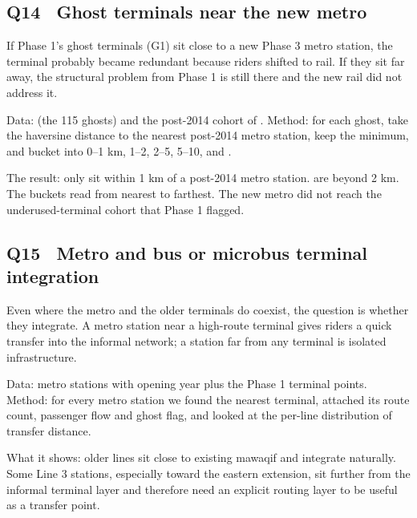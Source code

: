 \subsection{Q14 \textbullet\ Ghost terminals near the new metro}

If Phase 1's ghost terminals (G1) sit close to a new Phase 3 metro
station, the terminal probably became redundant because riders shifted
to rail. If they sit far away, the structural problem from Phase 1 is
still there and the new rail did not address it.

Data:  (the 115 ghosts) and
the post-2014 cohort of . Method: for each
ghost, take the haversine distance to the nearest post-2014 metro
station, keep the minimum, and bucket into 0--1 km, 1--2, 2--5, 5--10,
and .


The result: only  sit within 1 km of a
post-2014 metro station.  are beyond 2 km. The
buckets read  from nearest to farthest. The
new metro did not reach the underused-terminal cohort that Phase 1
flagged.

\subsection{Q15 \textbullet\ Metro and bus or microbus terminal integration}

Even where the metro and the older terminals do coexist, the question
is whether they integrate. A metro station near a high-route terminal
gives riders a quick transfer into the informal network; a station far
from any terminal is isolated infrastructure.

Data: metro stations with opening year plus the Phase 1 terminal
points. Method: for every metro station we found the nearest terminal,
attached its route count, passenger flow and ghost flag, and looked at
the per-line distribution of transfer distance.


What it shows: older lines sit close to existing mawaqif and integrate
naturally. Some Line 3 stations, especially toward the eastern
extension, sit further from the informal terminal layer and therefore
need an explicit routing layer to be useful as a transfer point.

